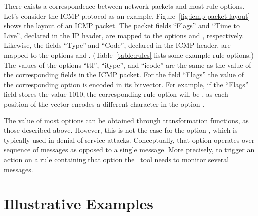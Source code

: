 \documentclass[runningheads]{llncs}
\begin{document}
There exists a correspondence between network packets and most rule
options. Let's consider the ICMP protocol as an
example. Figure~\ref{fig:icmp-packet-layout} shows the layout of an
ICMP packet. The packet fields ``Flags'' and ``Time to Live'',
declared in the IP header, are mapped to the options 
and , respectively. Likewise, the fields ``Type'' and
``Code'', declared in the ICMP header, are mapped to the options
 and . (Table~\ref{table:rules} lists some
example rule options.) The values of the options ``ttl'', ``itype'',
and ``icode'' are the same as the value of the corresponding fields in
the ICMP packet. For the field ``Flags'' the value of the
corresponding option is encoded in its bitvector. For example, if the
``Flags'' field stores the value 1010, the corresponding rule option
will be , as each position of the vector encodes a
different character in the option .

The value of most options can be obtained through transformation
functions, as those described above. However, this is not the case for
the option , which is typically used in
denial-of-service attacks. Conceptually, that option operates over
sequence of messages as opposed to a single message. More precisely,
to trigger an action on a rule containing that option the \nids\ tool
needs to monitor several messages.



\section{Illustrative Examples}
\label{sec:suri-metas-coverage}
\end{document}
